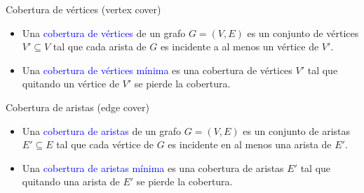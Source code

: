\documentclass{beamer} %
\newcommand{\blue}[1]{\textcolor{blue}{#1}}
\begin{document}
\begin{frame}{Cobertura de vértices (vertex cover)}
    \begin{itemize}
        \item<1-> Una \blue{cobertura de vértices} de un grafo $G=(V,E)$ es un conjunto de vértices $V'\subseteq V$ tal que cada arista de $G$ es incidente a al menos un vértice de $V'$.
        \item<3-> Una \blue{cobertura de vértices mínima} es una cobertura de vértices $V'$ tal que quitando un vértice de $V'$ se pierde la cobertura.
    \end{itemize}
\end{frame}

\begin{frame}{Cobertura de aristas (edge cover)}
    \begin{itemize}
        \item<1-> Una \blue{cobertura de aristas} de un grafo $G=(V,E)$ es un conjunto de aristas $E'\subseteq E$ tal que cada vértice de $G$ es incidente en al menos una arista de $E'$.
        \item<3-> Una \blue{cobertura de aristas mínima} es una cobertura de aristas $E'$ tal que quitando una arista de $E'$ se pierde la cobertura.
    \end{itemize}
\end{frame}
\end{document}
